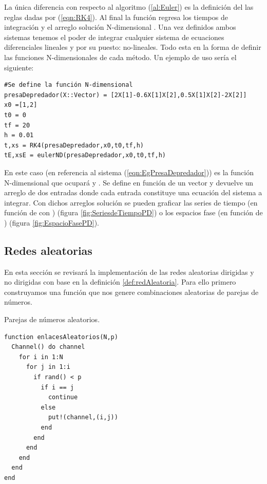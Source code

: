 \setlength{\parindent}{0cm} La única diferencia con respecto al algoritmo (\ref{al:Euler}) es la definición del las reglas dadas por (\ref{eqn:RK4}). Al final la función regresa los tiempos de integración  y el arreglo solución N-dimensional . Una vez definidos ambos sistemas tenemos el poder de integrar cualquier sistema de ecuaciones diferenciales lineales y por su puesto: no-lineales. Todo esta en la forma de definir las funciones  N-dimensionales de cada método. Un ejemplo de uso sería el siguiente:
\newpage
\begin{verbatim}
#Se define la función N-dimensional
presaDepredador(X::Vector) = [2X[1]-0.6X[1]X[2],0.5X[1]X[2]-2X[2]]
x0 =[1,2]
t0 = 0
tf = 20
h = 0.01
t,xs = RK4(presaDepredador,x0,t0,tf,h)
tE,xsE = eulerND(presaDepredador,x0,t0,tf,h)
\end{verbatim}
En este caso  (en referencia al sistema (\ref{eqn:EgPresaDepredador})) es la función N-dimensional que ocupará  y . Se define en función de un vector  y devuelve un arreglo de dos entradas donde cada entrada constituye una ecuación del sistema a integrar. Con dichos arreglos solución se pueden graficar las series de tiempo (en función de  con ) (figura \ref{fig:SeriesdeTiempoPD}) o los espacios fase (en función de ) (figura \ref{fig:EspacioFasePD}).

\subsection{Redes aleatorias}\label{sec:RedesAleatorias}

En esta sección se revisará la implementación de las redes aleatorias dirigidas y no dirigidas con base en la definición \ref{def:redAleatoria}. Para ello primero construyamos una función que nos genere combinaciones aleatorias de parejas de números.
\begin{algorithm}
	\caption{Parejas de números aleatorios.}
	\label{al:enlacesAleatorios}
	\begin{verbatim}
function enlacesAleatorios(N,p)
  Channel() do channel
    for i in 1:N
      for j in 1:i
        if rand() < p
          if i == j
            continue
          else
            put!(channel,(i,j))
          end
        end
      end
    end
  end
end
	\end{verbatim}
\end{algorithm}

